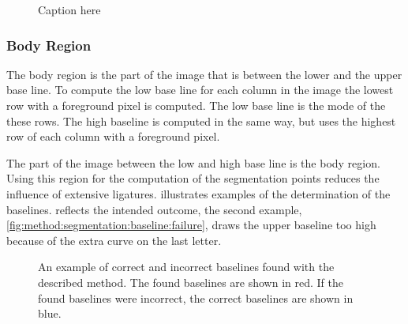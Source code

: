 \begin{figure}
	\centering
	\caption{Caption here}
	\label{fig:method:segmentation:tree}
\end{figure}

\subsubsection{Body Region}
\label{sss:method:segmentaton:bodyregion}
The body region is the part of the image that is between the lower and the upper base line. To compute the low base line for each column in the image the lowest row with a foreground pixel is computed. The low base line is the mode of the these rows. The high baseline is computed in the same way, but uses the highest row of each column with a foreground pixel. 

The part of the image between the low and high base line is the body region. Using this region for the computation of the segmentation points reduces the influence of extensive ligatures.  illustrates examples of the determination of the baselines.  reflects the intended outcome, the second example, \cref{fig:method:segmentation:baseline:failure}, draws the upper baseline too high because of the extra curve on the last letter.

	\begin{figure}
		\centering
		\hspace{0.05\columnwidth}
		\caption{An example of \protect{} correct and \protect{} incorrect baselines found with the described method. The found baselines are shown in red. If the found baselines were incorrect, the correct baselines are shown in blue.}
		\label{fig:method:segmentation:baseline}
	\end{figure}

